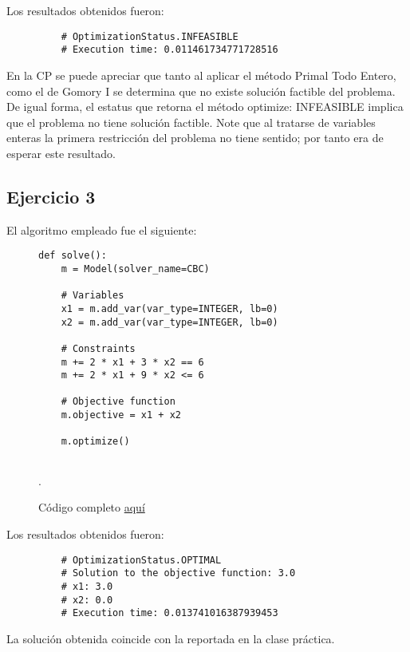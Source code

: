 \documentclass[titlepage, 11pt]{scrartcl}
\begin{document}
Los resultados obtenidos fueron:
\begin{figure}[H]
	\begin{verbatim}
	# OptimizationStatus.INFEASIBLE
	# Execution time: 0.011461734771728516
	\end{verbatim}
\end{figure}

En la CP se puede apreciar que tanto al aplicar el método Primal Todo Entero, como el de Gomory I se determina que no existe solución factible del problema. De igual forma, el estatus que retorna el método optimize: INFEASIBLE implica que el problema no tiene solución factible. Note que al tratarse de variables enteras la primera restricción del problema no tiene sentido; por tanto era de esperar este resultado.

	\subsection{Ejercicio 3}
El algoritmo empleado fue el siguiente:
\begin{figure}[H]
	\begin{verbatim}
def solve():
	m = Model(solver_name=CBC)
	
	# Variables
	x1 = m.add_var(var_type=INTEGER, lb=0)
	x2 = m.add_var(var_type=INTEGER, lb=0)
	
	# Constraints
	m += 2 * x1 + 3 * x2 == 6
	m += 2 * x1 + 9 * x2 <= 6
	
	# Objective function
	m.objective = x1 + x2
	
	m.optimize()
	
	\end{verbatim}
	\caption{Código completo \href{ex3.py}{aquí}}.
\end{figure}

Los resultados obtenidos fueron:
\begin{figure}[H]
	\begin{verbatim}
	# OptimizationStatus.OPTIMAL
	# Solution to the objective function: 3.0
	# x1: 3.0
	# x2: 0.0
	# Execution time: 0.013741016387939453
	\end{verbatim}
\end{figure}

La solución obtenida coincide con la reportada en la clase práctica.
\end{document}
